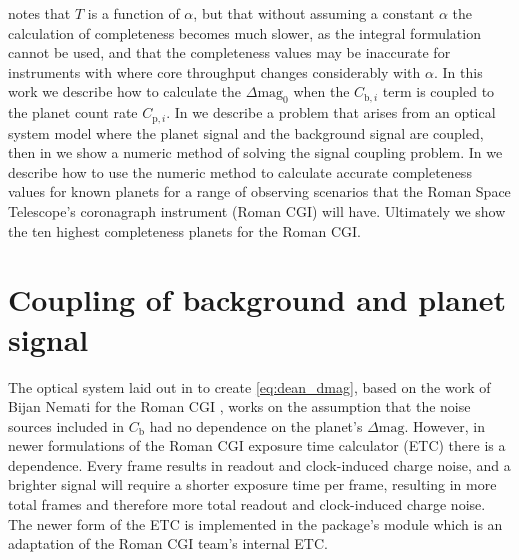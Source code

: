 \citet{keithlyOptimalScheduling2020} notes that $T$ is a function of $\alpha$, but
that without assuming a constant $\alpha$ the calculation of completeness becomes
much slower, as the integral formulation cannot be used, and that the
completeness values may be inaccurate for instruments with where core
throughput changes considerably with $\alpha$. In this work we describe how to
calculate the $\Delta\textrm{mag}_0$ when the $C_{\textrm{b},i}$ term is
coupled to the planet count rate $C_{\textrm{p},i}$. In  we describe a problem that arises from an optical
system model where the planet signal and the background signal are coupled,
then in  we show a numeric method of
solving the signal coupling problem. In  we describe
how to use the numeric method to calculate accurate completeness values for known
planets for a range of observing scenarios that the Roman Space Telescope's
coronagraph instrument (Roman CGI) will have. Ultimately we show the ten
highest completeness planets for the Roman CGI.


\section{Coupling of background and planet signal} %
\label{sec:Coupling of background and planet signal}

The optical system laid out in \citet{keithlyOptimalScheduling2020} to create
\ref{eq:dean_dmag}, based on the work of Bijan Nemati for the Roman CGI
\citep{Nemati2014, nematiSensitivityWFIRST2017, Nemati2020a}, works on the
assumption that the noise sources included in $C_{\textrm{b}}$ had no
dependence on the planet's $\Delta\textrm{mag}$. However, in newer formulations
of the Roman CGI exposure time calculator (ETC) there is a dependence. Every
frame results in readout and clock-induced charge noise, and a brighter signal
will require a shorter exposure time per frame, resulting in more total frames
and therefore more total readout and clock-induced charge noise. The newer form
of the ETC is implemented in the  package's 
module \cite{savranskyWFIRSTAFTACoronagraphScience2015} which is an adaptation
of the Roman CGI team's internal ETC.

